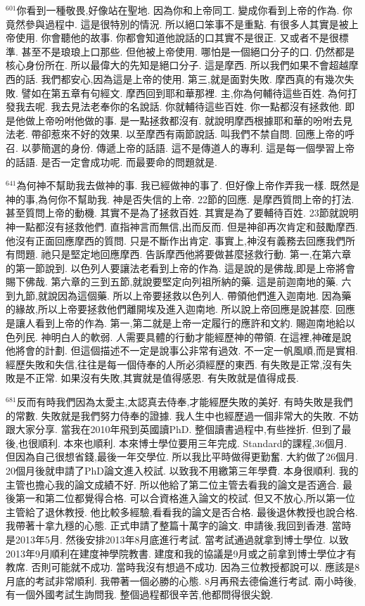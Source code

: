 \documentclass{book}
\begin{document}
$^{601}$你看到一種敬畏,好像站在聖地.
因為你和上帝同工.
變成你看到上帝的作為.
你竟然參與過程中.
這是很特別的情況.
所以絕口笨事不是重點.
有很多人其實是被上帝使用.
你會聽他的故事.
你都會知道他說話的口其實不是很正.
又或者不是很標準.
甚至不是琅琅上口那些.
但他被上帝使用.
哪怕是一個絕口分子的口.
仍然都是核心身份所在.
所以最偉大的先知是絕口分子.
這是摩西.
所以我們如果不會超越摩西的話.
我們都安心,因為這是上帝的使用.
第三,就是面對失敗.
摩西真的有幾次失敗.
譬如在第五章有句經文.
摩西回到耶和華那裡.
主,你為何輔待這些百姓.
為何打發我去呢.
我去見法老奉你的名說話.
你就輔待這些百姓.
你一點都沒有拯救他.
即是他做上帝吩咐他做的事.
是一點拯救都沒有.
就說明摩西根據耶和華的吩咐去見法老.
帶卻惹來不好的效果.
以至摩西有兩節說話.
叫我們不禁自問.
回應上帝的呼召.
以夢簡選的身份.
傳遞上帝的話語.
這不是傳道人的專利.
這是每一個學習上帝的話語.
是否一定會成功呢.
而最要命的問題就是.

$^{641}$為何神不幫助我去做神的事.
我已經做神的事了.
但好像上帝作弄我一樣.
既然是神的事,為何你不幫助我.
神是否失信的上帝.
22節的回應.
是摩西質問上帝的打法.
甚至質問上帝的動機.
其實不是為了拯救百姓.
其實是為了要輔待百姓.
23節就說明神一點都沒有拯救他們.
直指神言而無信,出而反而.
但是神卻再次肯定和鼓勵摩西.
他沒有正面回應摩西的質問.
只是不斷作出肯定.
事實上,神沒有義務去回應我們所有問題.
祂只是堅定地回應摩西.
告訴摩西他將要做甚麼拯救行動.
第一,在第六章的第一節說到.
以色列人要讓法老看到上帝的作為.
這是說的是佛哉,即是上帝將會賜下佛哉.
第六章的三到五節,就說要堅定向列祖所納的藥.
這是前迦南地的藥.
六到九節,就說因為這個藥.
所以上帝要拯救以色列人.
帶領他們進入迦南地.
因為藥的緣故,所以上帝要拯救他們離開埃及進入迦南地.
所以說上帝回應是說甚麼.
回應是讓人看到上帝的作為.
第一,第二就是上帝一定履行的應許和文約.
賜迦南地給以色列民.
神明白人的軟弱.
人需要具體的行動才能經歷神的帶領.
在這裡,神確是說他將會的計劃.
但這個描述不一定是說事公非常有過效.
不一定一帆風順,而是實相.
經歷失敗和失信,往往是每一個侍奉的人所必須經歷的東西.
有失敗是正常,沒有失敗是不正常.
如果沒有失敗,其實就是值得感恩.
有失敗就是值得成長.

$^{681}$反而有時我們因為太愛主,太認真去侍奉,才能經歷失敗的美好.
有時失敗是我們的常數.
失敗就是我們努力侍奉的證據.
我人生中也經歷過一個非常大的失敗.
不妨跟大家分享.
當我在2010年飛到英國讀PhD.
整個讀書過程中,有些挫折.
但到了最後,也很順利.
本來也順利.
本來博士學位要用三年完成.
Standard的課程,36個月.
但因為自己很想省錢,最後一年交學位.
所以我比平時做得更勤奮.
大約做了26個月.
20個月後就申請了PhD論文進入校試.
以致我不用繳第三年學費.
本身很順利.
我的主管也擔心我的論文成績不好.
所以他給了第二位主管去看我的論文是否適合.
最後第一和第二位都覺得合格.
可以合資格進入論文的校試.
但又不放心,所以第一位主管給了退休教授.
他比較多經驗,看看我的論文是否合格.
最後退休教授也說合格.
我帶著十拿九穩的心態.
正式申請了整篇十萬字的論文.
申請後,我回到香港.
當時是2013年5月.
然後安排2013年8月底進行考試.
當考試通過就拿到博士學位.
以致2013年9月順利在建度神學院教書.
建度和我的協議是9月或之前拿到博士學位才有教席.
否則可能就不成功.
當時我沒有想過不成功.
因為三位教授都說可以.
應該是8月底的考試非常順利.
我帶著一個必勝的心態.
8月再飛去德倫進行考試.
兩小時後,有一個外國考試生詢問我.
整個過程都很辛苦,他都問得很尖銳.
\end{document}
